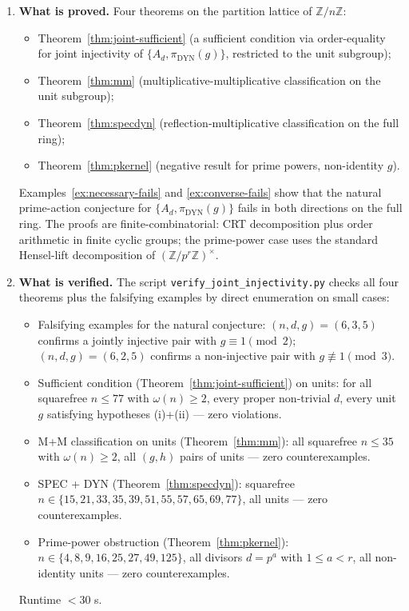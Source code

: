 \documentclass[11pt,reqno]{amsart}
\theoremstyle{plain}
\theoremstyle{definition}
\theoremstyle{remark}
\DeclareMathOperator{\dyn}{DYN}
\newcommand{\Z}{\mathbb{Z}}
\begin{document}
\begin{enumerate}[label={\upshape(\arabic*)}]
\item \textbf{What is proved.} Four theorems on the partition lattice
of $\Z/n\Z$:
\begin{itemize}
\item Theorem~\ref{thm:joint-sufficient} (a sufficient condition via
order-equality for joint injectivity of $\{A_{d}, \pi_{\dyn}(g)\}$,
restricted to the unit subgroup);
\item Theorem~\ref{thm:mm} (multiplicative-multiplicative
classification on the unit subgroup);
\item Theorem~\ref{thm:specdyn} (reflection-multiplicative
classification on the full ring);
\item Theorem~\ref{thm:pkernel} (negative result for prime powers,
non-identity $g$).
\end{itemize}
Examples~\ref{ex:necessary-fails} and \ref{ex:converse-fails} show
that the natural prime-action conjecture for $\{A_{d}, \pi_{\dyn}(g)\}$
fails in both directions on the full ring. The proofs are
finite-combinatorial: CRT decomposition plus order arithmetic in
finite cyclic groups; the prime-power case uses the standard
Hensel-lift decomposition of $(\Z/p^{r}\Z)^{\times}$.

\item \textbf{What is verified.} The script
\texttt{verify\_joint\_injectivity.py} checks all four theorems plus
the falsifying examples by direct enumeration on small cases:
\begin{itemize}
\item Falsifying examples for the natural conjecture: $(n, d, g) =
(6, 3, 5)$ confirms a jointly injective pair with $g \equiv 1
\pmod 2$; $(n, d, g) = (6, 2, 5)$ confirms a non-injective pair with
$g \not\equiv 1 \pmod 3$.
\item Sufficient condition (Theorem~\ref{thm:joint-sufficient}) on
units: for all squarefree $n \le 77$ with $\omega(n) \ge 2$, every
proper non-trivial $d$, every unit $g$ satisfying hypotheses
(i)+(ii) --- zero violations.
\item M+M classification on units (Theorem~\ref{thm:mm}):
all squarefree $n \le 35$ with $\omega(n) \ge 2$, all $(g, h)$ pairs
of units --- zero counterexamples.
\item SPEC + DYN (Theorem~\ref{thm:specdyn}):
squarefree $n \in \{15, 21, 33, 35, 39, 51, 55, 57, 65, 69, 77\}$,
all units --- zero counterexamples.
\item Prime-power obstruction (Theorem~\ref{thm:pkernel}):
$n \in \{4, 8, 9, 16, 25, 27, 49, 125\}$, all divisors $d = p^{a}$
with $1 \le a < r$, all non-identity units --- zero counterexamples.
\end{itemize}
Runtime $< 30$ s.


\end{enumerate}
\end{document}
